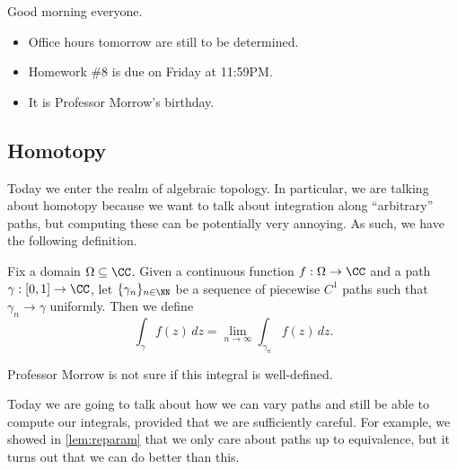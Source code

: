 
Good morning everyone.
\begin{itemize}
	\item Office hours tomorrow are still to be determined.
	\item Homework \#8 is due on Friday at 11:59PM.
	\item It is Professor Morrow's birthday.
\end{itemize}

\subsection{Homotopy}
Today we enter the realm of algebraic topology. In particular, we are talking about homotopy because we want to talk about integration along ``arbitrary'' paths, but computing these can be potentially very annoying.
\usepiecewisecone*
As such, we have the following definition.
\begin{definition}
	Fix a domain $\Omega\subseteq\CC$. Given a continuous function $f:\Omega\to\CC$ and a path $\gamma:[0,1]\to\CC$, let $\{\gamma_n\}_{n\in\NN}$ be a sequence of piecewise $C^1$ paths such that $\gamma_n\to\gamma$ uniformly. Then we define
	\[\int_\gamma f(z)\,dz=\lim_{n\to\infty}\int_{\gamma_n}f(z)\,dz.\]
\end{definition}
\begin{remark}
	Professor Morrow is not sure if this integral is well-defined.
\end{remark}
Today we are going to talk about how we can vary paths and still be able to compute our integrals, provided that we are sufficiently careful. For example, we showed in \autoref{lem:reparam} that we only care about paths up to equivalence, but it turns out that we can do better than this.

